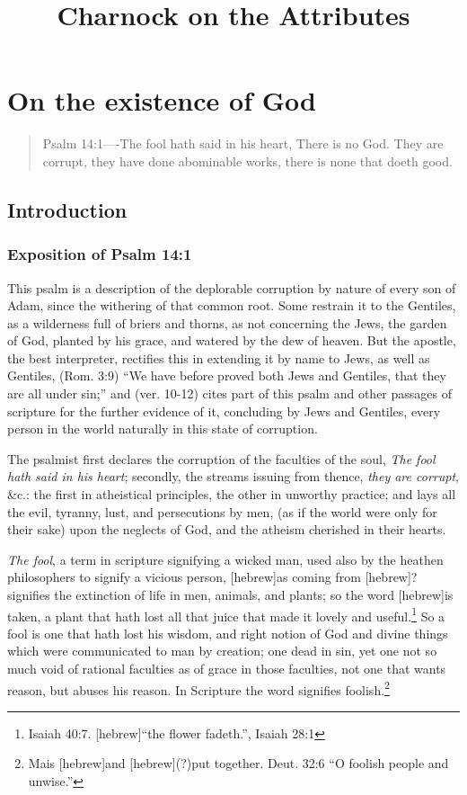 \documentclass[a5paper]{book}
\title{Charnock on the Attributes}
\newcommand{\heb}{[hebrew]}
\begin{document}
\maketitle
\tableofcontents
\chapter{On the existence of God}
\begin{quote}Psalm 14:1----The fool hath said in his heart, There is no God. They are corrupt, they have done abominable works, there is none that doeth good.
\end{quote}
\section{Introduction}
\subsection{Exposition of Psalm 14:1}
This psalm is a description 
    of the deplorable corruption by nature of every son of Adam, 
    since the withering of that common root.
Some restrain it to the Gentiles, 
    as a wilderness full of briers and thorns, 
    as not concerning the Jews, the garden of God, 
    planted by his grace, and watered by the dew of heaven. 
But the apostle, the best interpreter, 
    rectifies this in extending it by name to Jews, as well as Gentiles, 
    (Rom. 3:9) ``We have before proved both Jews and Gentiles, 
    that they are all under sin;'' and 
    (ver. 10-12) cites part of this psalm and other passages of scripture 
    for the further evidence of it, 
    concluding by Jews and Gentiles, 
    every person in the world naturally in this state of corruption.

The psalmist first declares the corruption of the faculties of the soul, 
    \emph{The fool hath said in his heart}; 
    secondly, the streams issuing from thence, \emph{they are corrupt}, \&c.: 
    the first in atheistical principles,
    the other in unworthy practice; 
    and lays all the evil, tyranny, lust, and persecutions by men, 
    (as if the world were only for their sake) upon the neglects of God, 
    and the atheism cherished in their hearts.

\emph{The fool}, a term in scripture signifying a wicked man, 
    used also by the heathen philosophers to signify a vicious person, 
    \heb as coming from \heb? 
    signifies the extinction of life in men, animals, and plants; 
    so the word \heb is taken, 
    a plant that hath lost all that juice that made it lovely and useful.\footnote{
        Isaiah 40:7. \heb ``the flower fadeth.'', Isaiah 28:1} 
So a fool is one that hath lost his wisdom, 
    and right notion of God and divine things 
    which were communicated to man by creation; 
    one dead in sin, 
    yet one not so much void of rational faculties 
    as of grace in those faculties, 
    not one that wants reason, but abuses his reason. 
In Scripture the word signifies foolish.\footnote{
        Mais \heb and \heb(?)put together. 
        Deut. 32:6 ``O foolish people and unwise.''} 
\end{document}
